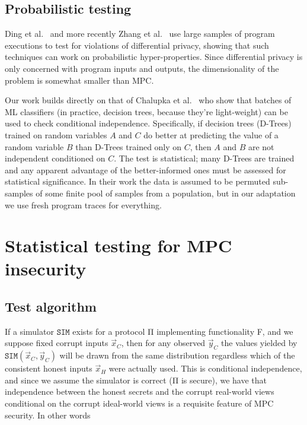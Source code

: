 \documentclass[compsoc, conference, a4paper, 10pt, times]{IEEEtran}
\begin{document}
\subsection{Probabilistic testing}

Ding et al.~\cite{ding2018detecting} %
and more recently Zhang et al.~\cite{zhang2020testing} %
use large samples of program executions to test for violations of differential privacy,
showing that such techniques can work on probabilistic hyper-properties.
Since differential privacy is only concerned with program inputs and outputs,
the dimensionality of the problem is somewhat smaller than MPC.

Our work builds directly on that of Chalupka et al.~\cite{chalupka2018fast}
who show that batches of ML classifiers (in practice, decision trees, because they're light-weight) can be used to check conditional independence.
Specifically, if decision trees (D-Trees) trained on random variables $A$ and $C$
do better at predicting the value of a random variable $B$ than D-Trees trained only on $C$,
then $A$ and $B$ are not independent conditioned on $C$.
The test is statistical; many D-Trees are trained and any apparent advantage of the better-informed ones must be assessed for statistical significance.
In their work the data is assumed to be permuted sub-samples of some finite pool of samples from a population,
but in our adaptation we use fresh program traces for everything.


\section{Statistical testing for MPC insecurity}

\subsection{Test algorithm}

If a simulator $\mathtt{SIM}$ exists for a protocol Π implementing functionality F,
and we suppose fixed corrupt inputs $\vec{x}_C$,
then for any observed $\vec{y}_C$ the values yielded by $\mathtt{SIM}(\vec{x}_C, \vec{y}_C)$
will be drawn from the same distribution regardless which of the consistent honest inputs $\vec{x}_H$ were actually used.
This is conditional independence, and since we assume the simulator is correct (Π is secure),
we have that independence between the honest secrets and the corrupt real-world views conditional on the corrupt ideal-world views
is a requisite feature of MPC security.
In other words
\end{document}
